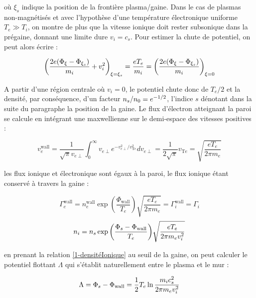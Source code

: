 \begin{refsection}
où $\xi_s$ indique la position de la frontière plasma/gaine.
Dans le cas de plasmas non-magnétisés et avec l'hypothèse d'une température
électronique uniforme $T_{e}\gg T_{i}$, on montre de plus que la
vitesse ionique doit rester subsonique dans la prégaine, donnant une limite dure
$v_{i}=c_{s}$.
Pour estimer la chute de potentiel, on peut alors écrire :

\begin{equation}
	\left(\frac{2e(\Phi_{\xi}-\Phi_{\xi_{s}})}{m_{i}}+v_{i}^{{2}}\right)_{\xi=\xi_s}=
	\frac{eT_{e}}{m_{i}}=\left(\frac{2e(\Phi_{\xi}-\Phi_{\xi_{s}})}{m_{i}}\right)_{\xi=0}
\end{equation}

A partir d'une région centrale où $v_{i}=0$, le potentiel chute donc de
$T_{e}/2$ et la densité, par conséquence, d'un facteur
$n_{s}/n{_{0}}=e^{-1/2}$, l'indice $s$ dénotant dans la suite du
paragraphe la position de la gaine.
Le flux d'électron atteignant la paroi se calcule en intégrant une maxwellienne sur le
demi-espace des vitesses positives :

\begin{equation}
	v_{e}^\text{wall}=\frac{1}{\sqrt{\pi}v_{e\perp}}\int_0^\infty
	v_{e\perp}
	e^{-v_{e\perp}^2/v_{\text{T}e}^2}dv_{e\perp}=\frac{1}{2\sqrt{\pi}}v_{\text{T}e}=\sqrt{\frac{eT_{e}}{2\pi
	m_{e}}}
\end{equation}

les flux ionique et électronique sont égaux à la paroi, le flux ionique étant
conservé à travers la gaine :

\begin{equation}
	\Gamma_{e}^\text{wall}=n_{e}^\text{wall}\exp{\left(\frac{\Phi_\text{wall}}{T_{e}}\right)}\sqrt{\frac{eT_{e}}{2\pi
	m_{e}}}=\Gamma_{i}^\text{wall}=\Gamma_{i}
\end{equation}
\begin{equation}
\label{1-densitéIonique}
	n_{i}=n_{s}\exp{\left(\frac{\Phi_{s}-\Phi_\text{wall}}{T_{e}}\right)}\sqrt{\frac{eT_{e}}{2\pi
	m_{e}v_{i}^{{2}}}}
\end{equation}

en prenant la relation \ref{1-densitéIonique} au seuil de la gaine, on peut
calculer le potentiel flottant $\Lambda$ qui s'établit naturellement entre le
plasma et le mur :

\begin{equation}
	\Lambda=\Phi_{s}-\Phi_\text{wall}=\frac{1}{2}T_{e}\ln{\frac{m_{i}c_{s}^2}{2\pi
	m_{e}v_{i}^{{2}}}}
	\end{equation}


\end{refsection}
